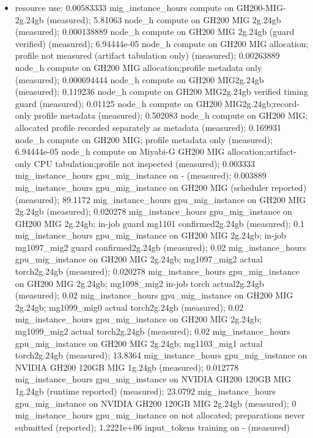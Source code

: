 \documentclass[11pt]{article}
\begin{document}
\begin{itemize}
\item resource use: 0.00583333 mig\_instance\_hours compute on GH200-MIG-2g.24gb (measured); 5.81063 node\_h compute on GH200 MIG 2g.24gb (measured); 0.000138889 node\_h compute on GH200 MIG 2g.24gb (guard verified) (measured); 6.94444e-05 node\_h compute on GH200 MIG allocation; profile not measured (artifact tabulation only) (measured); 0.00263889 node\_h compute on GH200 MIG allocation;profile metadata only (measured); 0.000694444 node\_h compute on GH200 MIG2g.24gb (measured); 0.119236 node\_h compute on GH200 MIG2g.24gb verified timing guard (measured); 0.01125 node\_h compute on GH200 MIG2g.24gb;record-only profile metadata (measured); 0.502083 node\_h compute on GH200 MIG; allocated profile recorded separately as metadata (measured); 0.169931 node\_h compute on GH200 MIG; profile metadata only (measured); 6.94444e-05 node\_h compute on Miyabi-G GH200 MIG allocation;artifact-only CPU tabulation;profile not inspected (measured); 0.003333 mig\_instance\_hours gpu\_mig\_instance on - (measured); 0.003889 mig\_instance\_hours gpu\_mig\_instance on GH200 MIG (scheduler reported) (measured); 89.1172 mig\_instance\_hours gpu\_mig\_instance on GH200 MIG 2g.24gb (measured); 0.020278 mig\_instance\_hours gpu\_mig\_instance on GH200 MIG 2g.24gb; in-job guard mg1101 confirmed2g.24gb (measured); 0.1 mig\_instance\_hours gpu\_mig\_instance on GH200 MIG 2g.24gb; in-job mg1097\_mig2 guard confirmed2g.24gb (measured); 0.02 mig\_instance\_hours gpu\_mig\_instance on GH200 MIG 2g.24gb; mg1097\_mig2 actual torch2g.24gb (measured); 0.020278 mig\_instance\_hours gpu\_mig\_instance on GH200 MIG 2g.24gb; mg1098\_mig2 in-job torch actual2g.24gb (measured); 0.02 mig\_instance\_hours gpu\_mig\_instance on GH200 MIG 2g.24gb; mg1099\_mig0 actual torch2g.24gb (measured); 0.02 mig\_instance\_hours gpu\_mig\_instance on GH200 MIG 2g.24gb; mg1099\_mig2 actual torch2g.24gb (measured); 0.02 mig\_instance\_hours gpu\_mig\_instance on GH200 MIG 2g.24gb; mg1103\_mig1 actual torch2g.24gb (measured); 13.8364 mig\_instance\_hours gpu\_mig\_instance on NVIDIA GH200 120GB MIG 1g.24gb (measured); 0.012778 mig\_instance\_hours gpu\_mig\_instance on NVIDIA GH200 120GB MIG 1g.24gb (runtime reported) (measured); 23.0792 mig\_instance\_hours gpu\_mig\_instance on NVIDIA GH200 120GB MIG 2g.24gb (measured); 0 mig\_instance\_hours gpu\_mig\_instance on not allocated; preparations never submitted (reported); 1.2221e+06 input\_tokens training on - (measured)
\end{itemize}
\end{document}
